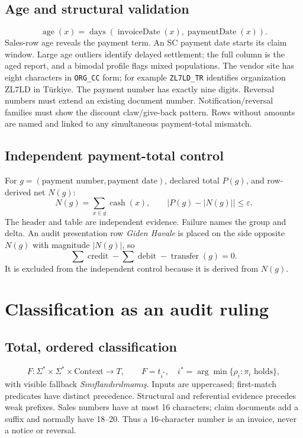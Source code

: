\documentclass[11pt,a4paper]{article}
\newcommand{\eps}{\varepsilon}
\newcommand{\cash}{\operatorname{cash}}
\theoremstyle{definition}
\begin{document}
\subsection{Age and structural validation}
\[
\operatorname{age}(x)=\operatorname{days}
(\operatorname{invoiceDate}(x),\operatorname{paymentDate}(x)).
\]
Sales-row age reveals the payment term. An SC payment date starts its
claim window. Large age outliers identify delayed settlement; the full
column is the aged report, and a bimodal profile flags mixed populations.
The vendor site has eight characters in \texttt{ORG\_CC} form; for
example \texttt{ZL7LD\_TR} identifies organization ZL7LD in Türkiye.
The payment number has exactly nine digits. Reversal numbers must extend
an existing document number. Notification/reversal families must show
the discount claw/give-back pattern. Rows without amounts are named and
linked to any simultaneous payment-total mismatch.

\subsection{Independent payment-total control}
For $g=(\text{payment number},\text{payment date})$, declared total
$P(g)$, and row-derived net $N(g)$:
\[
N(g)=\sum_{x\in g}\cash(x),\qquad
\bigl|P(g)-|N(g)|\bigr|\le\eps.
\]
The header and table are independent evidence. Failure names the group
and delta. An audit presentation row \emph{Giden Havale} is placed on
the side opposite $N(g)$ with magnitude $|N(g)|$, so
\[
\sum\operatorname{credit}-\sum\operatorname{debit}
-\operatorname{transfer}(g)=0.
\]
It is excluded from the independent control because it is derived from
$N(g)$.

\section{Classification as an audit ruling}
\subsection{Total, ordered classification}
\[
F:\Sigma^*\times\Sigma^*\times\mathrm{Context}\to T,
\qquad
F=t_{i^*},\quad i^*=\arg\min\{\rho_i:\pi_i\text{ holds}\},
\]
with visible fallback \emph{Sınıflandırılmamış}. Inputs are uppercased;
first-match predicates have distinct precedence. Structural and
referential evidence precedes weak prefixes. Sales numbers have at most
16 characters; claim documents add a suffix and normally have 18--20.
Thus a 16-character number is an invoice, never a notice or reversal.
\end{document}
